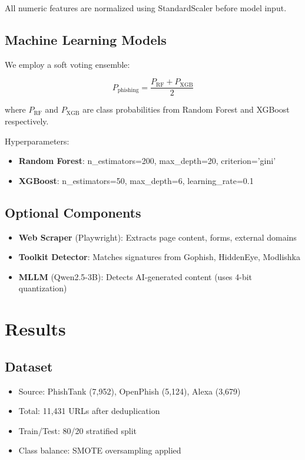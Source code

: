 \documentclass[10pt, conference]{IEEEtran}
\begin{document}
All numeric features are normalized using StandardScaler before model input.

\subsection{Machine Learning Models}
We employ a soft voting ensemble:

\begin{equation}
    P_{\text{phishing}} = \frac{P_{\text{RF}} + P_{\text{XGB}}}{2}
\end{equation}

where $P_{\text{RF}}$ and $P_{\text{XGB}}$ are class probabilities from Random Forest and XGBoost respectively.

Hyperparameters:
\begin{itemize}
    \item \textbf{Random Forest}: n\_estimators=200, max\_depth=20, criterion='gini'
    \item \textbf{XGBoost}: n\_estimators=50, max\_depth=6, learning\_rate=0.1
\end{itemize}

\subsection{Optional Components}
\begin{itemize}
    \item \textbf{Web Scraper} (Playwright): Extracts page content, forms, external domains
    \item \textbf{Toolkit Detector}: Matches signatures from Gophish, HiddenEye, Modlishka
    \item \textbf{MLLM} (Qwen2.5-3B): Detects AI-generated content (uses 4-bit quantization)
\end{itemize}

\section{Results}

\subsection{Dataset}
\begin{itemize}
    \item Source: PhishTank (7,952), OpenPhish (5,124), Alexa (3,679)
    \item Total: 11,431 URLs after deduplication
    \item Train/Test: 80/20 stratified split
    \item Class balance: SMOTE oversampling applied
\end{itemize}
\end{document}
